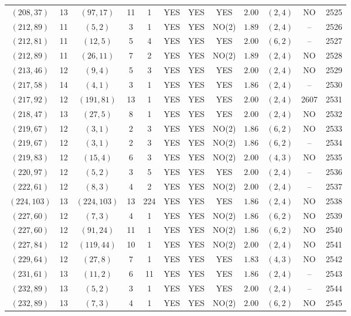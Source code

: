 \begin{longtable}{|c|c|c|c|c|c|c|c|c|c|c|c|}
$(208,37)$ & 13 & $(97,17)$ & 11 & 1 & YES & YES & YES & $2.00$ & $(2,4)$ & NO & 2525\\
$(212,89)$ & 11 & $(5,2)$ & 3 & 1 & YES & YES & NO(2) & $1.89$ & $(2,4)$ & -- & 2526\\
$(212,81)$ & 11 & $(12,5)$ & 5 & 4 & YES & YES & YES & $2.00$ & $(6,2)$ & -- & 2527\\
$(212,89)$ & 11 & $(26,11)$ & 7 & 2 & YES & YES & NO(2) & $1.89$ & $(2,4)$ & NO & 2528\\
$(213,46)$ & 12 & $(9,4)$ & 5 & 3 & YES & YES & YES & $2.00$ & $(2,4)$ & NO & 2529\\
$(217,58)$ & 14 & $(4,1)$ & 3 & 1 & YES & YES & YES & $1.86$ & $(2,4)$ & -- & 2530\\
$(217,92)$ & 12 & $(191,81)$ & 13 & 1 & YES & YES & YES & $2.00$ & $(2,4)$ & 2607 & 2531\\
$(218,47)$ & 13 & $(27,5)$ & 8 & 1 & YES & YES & YES & $2.00$ & $(2,4)$ & NO & 2532\\
$(219,67)$ & 12 & $(3,1)$ & 2 & 3 & YES & YES & NO(2) & $1.86$ & $(6,2)$ & NO & 2533\\
$(219,67)$ & 12 & $(3,1)$ & 2 & 3 & YES & YES & NO(2) & $1.86$ & $(6,2)$ & -- & 2534\\
$(219,83)$ & 12 & $(15,4)$ & 6 & 3 & YES & YES & NO(2) & $2.00$ & $(4,3)$ & NO & 2535\\
$(220,97)$ & 12 & $(5,2)$ & 3 & 5 & YES & YES & YES & $2.00$ & $(2,4)$ & -- & 2536\\
$(222,61)$ & 12 & $(8,3)$ & 4 & 2 & YES & YES & NO(2) & $2.00$ & $(2,4)$ & -- & 2537\\
$(224,103)$ & 13 & $(224,103)$ & 13 & 224 & YES & YES & YES & $1.86$ & $(2,4)$ & NO & 2538\\
$(227,60)$ & 12 & $(7,3)$ & 4 & 1 & YES & YES & NO(2) & $1.86$ & $(6,2)$ & NO & 2539\\
$(227,60)$ & 12 & $(91,24)$ & 11 & 1 & YES & YES & NO(2) & $1.86$ & $(6,2)$ & NO & 2540\\
$(227,84)$ & 12 & $(119,44)$ & 10 & 1 & YES & YES & NO(2) & $2.00$ & $(2,4)$ & NO & 2541\\
$(229,64)$ & 12 & $(27,8)$ & 7 & 1 & YES & YES & YES & $1.83$ & $(4,3)$ & NO & 2542\\
$(231,61)$ & 13 & $(11,2)$ & 6 & 11 & YES & YES & YES & $1.86$ & $(2,4)$ & -- & 2543\\
$(232,89)$ & 13 & $(5,2)$ & 3 & 1 & YES & YES & YES & $2.00$ & $(2,4)$ & -- & 2544\\
$(232,89)$ & 13 & $(7,3)$ & 4 & 1 & YES & YES & NO(2) & $2.00$ & $(6,2)$ & NO & 2545\\

\end{longtable}
